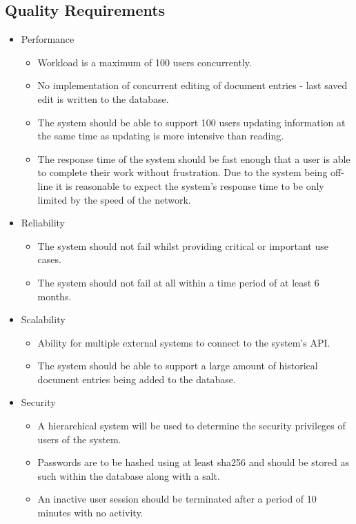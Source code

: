\documentclass{article}
\begin{document}
		\subsection{Quality Requirements}\label{subsec:quality}
			\begin{itemize}
				\item Performance
				\begin{itemize}
					\item Workload is a maximum of 100 users concurrently.
					\item No implementation of concurrent editing of document entries - last saved edit is written to the database.
					\item The system should be able to support 100 users updating information at the same time as updating is more intensive than reading.
					\item The response time of the system should be fast enough that a user is able to complete their work without frustration. Due to the system being off-line it is reasonable to expect the system's response time to be only limited by the speed of the network.
				\end{itemize}
				\item Reliability
				\begin{itemize}
					\item The system should not fail whilst providing critical or important use cases.
					\item The system should not fail at all within a time period of at least 6 months.
				\end{itemize}
				\item Scalability
				\begin{itemize}
					\item Ability for multiple external systems to connect to the system's API.
					\item The system should be able to support a large amount of historical document entries being added to the database.
				\end{itemize}
				\item Security
				\begin{itemize}
					\item A hierarchical system will be used to determine the security privileges of users of the system.
					\item Passwords are to be hashed using at least sha256 and should be stored as such within the database along with a salt.
					\item An inactive user session should be terminated after a period of 10 minutes with no activity.

\end{itemize}
\end{itemize}
\end{document}
